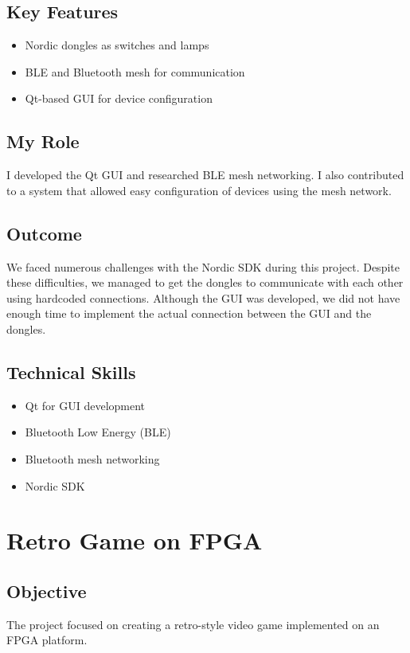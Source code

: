 \documentclass{article}
\begin{document}
\subsection{Key Features}
\begin{itemize}
    \item Nordic dongles as switches and lamps
    \item BLE and Bluetooth mesh for communication
    \item Qt-based GUI for device configuration
\end{itemize}

\subsection{My Role}
I developed the Qt GUI and researched BLE mesh networking. I also contributed to a system that allowed easy configuration of devices using the mesh network.

\subsection{Outcome}
We faced numerous challenges with the Nordic SDK during this project. Despite these difficulties, we managed to get the dongles to communicate with each other using hardcoded connections. Although the GUI was developed, we did not have enough time to implement the actual connection between the GUI and the dongles.

\subsection{Technical Skills}
\begin{itemize}
    \item Qt for GUI development
    \item Bluetooth Low Energy (BLE)
    \item Bluetooth mesh networking
    \item Nordic SDK
\end{itemize}

\section{Retro Game on FPGA}
\subsection{Objective}
The project focused on creating a retro-style video game implemented on an FPGA platform.
\end{document}
